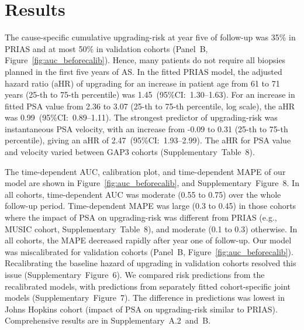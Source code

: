 \section{Results}
The cause-specific cumulative upgrading-risk at year five of follow-up was 35\% in PRIAS and at most 50\% in validation cohorts (Panel~B, Figure~\ref{fig:auc_beforecalib}). Hence, many patients do not require all biopsies planned in the first five years of AS. In the fitted PRIAS model, the adjusted hazard ratio (aHR) of upgrading for an increase in patient age from 61 to 71 years (25-th to 75-th percentile) was 1.45~(95\%CI:~1.30--1.63). For an increase in fitted PSA value from 2.36 to 3.07 (25-th to 75-th percentile, log scale), the aHR was 0.99~(95\%CI:~0.89--1.11). The strongest predictor of upgrading-risk was instantaneous PSA velocity, with an increase from -0.09 to 0.31 (25-th to 75-th percentile), giving an aHR of 2.47~(95\%CI:~1.93--2.99). The aHR for PSA value and velocity varied between GAP3 cohorts (Supplementary~Table~8).

The time-dependent AUC, calibration plot, and time-dependent MAPE of our model are shown in Figure~\ref{fig:auc_beforecalib}, and Supplementary~Figure~8. In all cohorts, time-dependent AUC was moderate (0.55 to 0.75) over the whole follow-up period. Time-dependent MAPE was large (0.3 to 0.45) in those cohorts where the impact of PSA on upgrading-risk was different from PRIAS (e.g., MUSIC cohort, Supplementary~Table~8), and moderate (0.1 to 0.3) otherwise. In all cohorts, the MAPE decreased rapidly after year one of follow-up. Our model was miscalibrated for validation cohorts (Panel~B, Figure~\ref{fig:auc_beforecalib}). Recalibrating the baseline hazard of upgrading in validation cohorts resolved this issue (Supplementary~Figure~6). We compared risk predictions from the recalibrated models, with predictions from separately fitted cohort-specific joint models (Supplementary~Figure~7). The difference in predictions was lowest in Johns Hopkins cohort (impact of PSA on upgrading-risk similar to PRIAS). Comprehensive results are in Supplementary~A.2~and~B.


